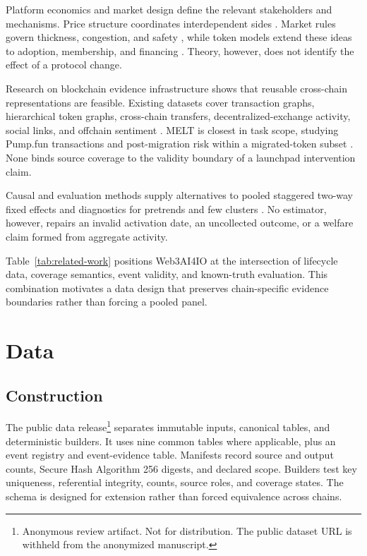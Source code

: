 \documentclass{article}
\begin{document}
Platform economics and market design define the relevant stakeholders and mechanisms. Price structure coordinates interdependent sides \citep{rochettirole2003}. Market rules govern thickness, congestion, and safety \citep{roth2008}, while token models extend these ideas to adoption, membership, and financing \citep{cong2021tokenomics,sockinxiong2023,gryglewicz2021,malinovapark2023}. Theory, however, does not identify the effect of a protocol change.

Research on blockchain evidence infrastructure shows that reusable cross-chain representations are feasible. Existing datasets cover transaction graphs, hierarchical token graphs, cross-chain transfers, decentralized-exchange activity, social links, and offchain sentiment \citep{shamsi2022chartalist,luo2024gog,augusto2025xchain,chemaya2025uniswap,wang2024exgraph,chen2024finml}. MELT is closest in task scope, studying Pump.fun transactions and post-migration risk within a migrated-token subset \citep{hu2026memetrans}. None binds source coverage to the validity boundary of a launchpad intervention claim.

Causal and evaluation methods supply alternatives to pooled staggered two-way fixed effects and diagnostics for pretrends and few clusters \citep{callaway2021,sunabraham2021,borusyak2024,rambachanroth2023,mackinnonwebb2018}. No estimator, however, repairs an invalid activation date, an uncollected outcome, or a welfare claim formed from aggregate activity.



Table~\ref{tab:related-work} positions Web3AI4IO at the intersection of lifecycle data, coverage semantics, event validity, and known-truth evaluation. This combination motivates a data design that preserves chain-specific evidence boundaries rather than forcing a pooled panel.

\section{Data}
\label{sec:data}

\subsection{Construction}

The public data release\footnote{Anonymous review artifact. Not for distribution. The public dataset URL is withheld from the anonymized manuscript.} separates immutable inputs, canonical tables, and deterministic builders. It uses nine common tables where applicable, plus an event registry and event-evidence table. Manifests record source and output counts, Secure Hash Algorithm 256 digests, and declared scope. Builders test key uniqueness, referential integrity, counts, source roles, and coverage states. The schema is designed for extension rather than forced equivalence across chains.
\end{document}

